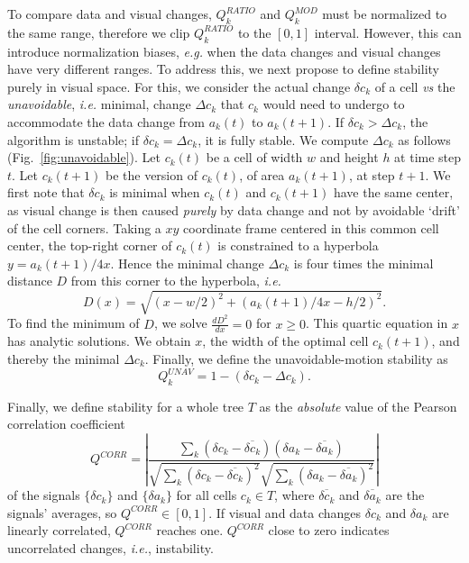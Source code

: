 To compare data and visual changes, $Q_k^{RATIO}$ and $Q_k^{MOD}$ must be normalized to the same range, therefore we clip $Q_k^{RATIO}$ to the $[0,1]$ interval. However, this can introduce normalization biases, \emph{e.g.} when the data changes and visual changes have very different ranges. To address this, we next propose to define stability purely in visual space. For this, we consider the actual change $\delta c_k$ of a cell \emph{vs} the \emph{unavoidable}, \emph{i.e.} minimal, change $\Delta c_k$ that $c_k$ would need to undergo to accommodate the data change from $a_k(t)$ to $a_k(t+1)$. If $\delta c_k > \Delta c_k$, the algorithm is unstable; if $\delta c_k = \Delta c_k$, it is fully stable. We compute $\Delta c_k$ as follows (Fig.~\ref{fig:unavoidable}). Let $c_k(t)$ be a cell of width $w$ and height $h$ at time step $t$. Let $c_k(t+1)$ be the version of $c_k(t)$, of area $a_k(t+1)$, at step $t+1$. We first note that $\delta c_k$ is minimal when $c_k(t)$ and $c_k(t+1)$ have the same center, as visual change is then caused \emph{purely} by data change and not by avoidable `drift' of the cell corners. Taking a $xy$ coordinate frame centered in this common cell center, the top-right corner of $c_k(t)$ is constrained to a hyperbola $y = a_k(t+1)/4x$. Hence the minimal change $\Delta c_k$ is four times the minimal distance $D$ from this corner to the hyperbola, \emph{i.e.}
%
\begin{equation}
D(x) = \sqrt{(x - w/2)^2 + (a_k(t+1)/4x - h/2)^2}. \nonumber
\end{equation}
%
To find the minimum of $D$, we solve $\frac{d D^2}{d x}=0$ for $x \geq 0$. This quartic equation in $x$ has analytic solutions. We obtain $x$, the width of the optimal cell $c_k(t+1)$, and thereby the minimal $\Delta c_k$. Finally, we define the unavoidable-motion stability as
%
\begin{equation}
Q^{UNAV}_k = 1 - (\delta c_k - \Delta c_k).
\end{equation}
%

Finally, we define stability for a whole tree $T$ as the \emph{absolute} value of the Pearson correlation coefficient
%
\begin{equation}
Q^{CORR} = \left| \frac{  \sum_k (\delta c_k - \overline{\delta c_k}) (\delta a_k - \overline{\delta a_k})  } {\sqrt { \sum_k (\delta c_k - \overline{\delta c_k})^2} \sqrt { \sum_k (\delta a_k - \overline{\delta a_k})^2}   }\right|
\label{eqn:pearson}
\end{equation}
%
of the signals $\{\delta c_k\}$ and $\{\delta a_k\}$ for all cells $c_k \in T$, where $\overline{\delta c_k}$ and $\overline{\delta a_k}$ are the signals' averages, so $Q^{CORR} \in [0,1]$. If visual and data changes $\delta c_k$ and $\delta a_k$ are linearly correlated, $Q^{CORR}$ reaches one. $Q^{CORR}$ close to zero indicates uncorrelated changes, \emph{i.e.}, instability.

